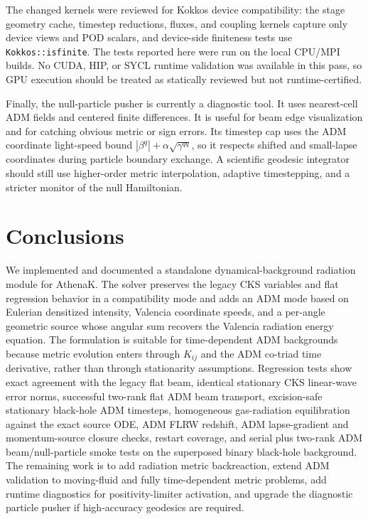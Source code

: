 \documentclass[11pt]{article}
\newcommand{\code}[1]{\texttt{#1}}
\begin{document}
The changed kernels were reviewed for Kokkos device compatibility: the stage
geometry cache, timestep reductions, fluxes, and coupling kernels capture only
device views and POD scalars, and device-side finiteness tests use
\code{Kokkos::isfinite}.  The tests reported here were run on the local CPU/MPI
builds.  No CUDA, HIP, or SYCL runtime validation was available in this pass,
so GPU execution should be treated as statically reviewed but not
runtime-certified.

Finally, the null-particle pusher is currently a diagnostic tool.  It uses
nearest-cell ADM fields and centered finite differences.  It is useful for beam
edge visualization and for catching obvious metric or sign errors.  Its
timestep cap uses the ADM coordinate light-speed bound
\(|\beta^q|+\alpha\sqrt{\gamma^{qq}}\), so it respects shifted and small-lapse
coordinates during particle boundary exchange.  A scientific geodesic
integrator should still use higher-order metric interpolation, adaptive
timestepping, and a stricter monitor of the null Hamiltonian.

\section{Conclusions}
\label{sec:conclusions}

We implemented and documented a standalone dynamical-background radiation
module for AthenaK.  The solver preserves the legacy CKS variables and flat
regression behavior in a compatibility mode and adds an ADM mode based on
Eulerian densitized intensity, Valencia
coordinate speeds, and a per-angle geometric source whose angular sum recovers
the Valencia radiation energy equation.  The formulation is suitable for
time-dependent ADM backgrounds because metric evolution enters through
\(K_{ij}\) and the ADM co-triad time derivative, rather than through
stationarity assumptions.  Regression tests show exact agreement with the
legacy flat beam, identical stationary CKS linear-wave error norms, successful
two-rank flat ADM beam transport, excision-safe stationary black-hole ADM
timesteps, homogeneous gas-radiation equilibration against the exact source
ODE, ADM FLRW redshift, ADM lapse-gradient and momentum-source closure checks,
restart coverage, and serial plus two-rank ADM beam/null-particle smoke tests
on the superposed binary black-hole background.  The remaining work is to add
radiation metric backreaction, extend ADM validation to moving-fluid and fully
time-dependent metric problems, add runtime diagnostics for positivity-limiter
activation, and upgrade the diagnostic particle pusher if high-accuracy
geodesics are required.
\end{document}
